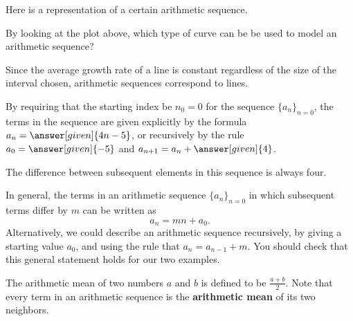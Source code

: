 \documentclass{ximera}
\begin{document}
\begin{example}
  Here is a representation of a certain arithmetic sequence.
  \begin{image}
  \end{image}
  
 \begin{question}
 By looking at the plot above, which type of curve can be be used to model an arithmetic sequence?

  \begin{feedback}
    Since the average growth rate of a line is constant regardless of
    the size of the interval chosen, arithmetic sequences correspond to
    lines.
  \end{feedback}
\end{question}


  By requiring that the starting index be $n_0=0$ for the sequence $\{a_n\}_{n=0}$, the terms in the sequence are given explicitly by the formula $a_n=\answer[given]{4n-5}$,
  or recursively by the rule $a_0 = \answer[given]{-5}$ and $a_{n+1} = a_n
  + \answer[given]{4}$. 

  The difference between subsequent elements in this sequence is always four.
\end{example}

In general, the terms in an arithmetic sequence $\{a_n\}_{n=0}$ in which subsequent terms differ
by $m$ can be written as
\[
a_n = m n + a_0.
\]
Alternatively, we could describe an arithmetic sequence recursively,
by giving a starting value $a_0$, and using the rule that $a_{n} =
a_{n-1} + m$.  You should check that this general statement holds for our 
two examples.


\begin{remark}
The arithmetic mean of two numbers $a$ and $b$ is defined to be $\frac{a+b}{2}$. Note that every term in an arithmetic sequence is the \textbf{arithmetic mean} of its two neighbors.  
\end{remark}
\end{document}
